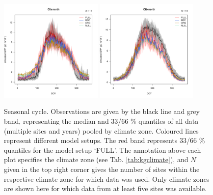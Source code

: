\documentclass{myreport}
\begin{document}
\begin{figure}[!ht]
\includegraphics[width=0.45\textwidth]{fig/meandoy_byzone_Cfa_north_.pdf}
\includegraphics[width=0.45\textwidth]{fig/meandoy_byzone_Cfb_north_.pdf}\\
    \caption{Seasonal cycle. Observations are given by the black line and grey band, representing the median and 33/66 \% quantiles of all data (multiple sites and years) pooled by climate zone. Coloured lines represent different model setups. The red band represents 33/66 \% quantiles for the model setup `FULL'. The annotation above each plot specifies the climate zone (see Tab. \ref{tab:kgclimate}), and $N$ given in the top right corner gives the number of sites within the respective climate zone for which data was used. Only climate zones are shown here for which data from at least five sites was available.}
    \label{fig:season}
\end{figure}
\end{document}
